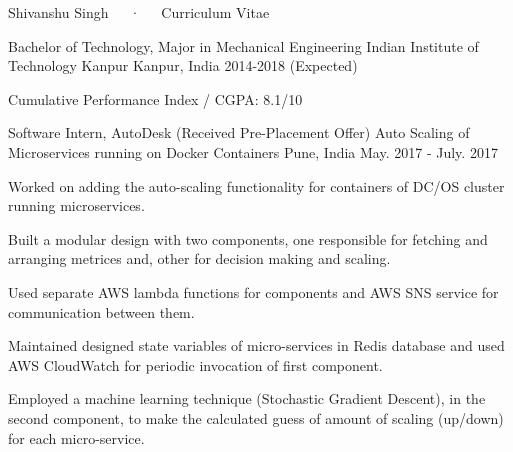 \documentclass[11pt, a4paper]{cv}
\begin{document}
\makecvheader

\makecvfooter
  {}
  {Shivanshu Singh~~~·~~~Curriculum Vitae}
  {\thepage}


\begin{cventries}

  \cventry
    {Bachelor of Technology, Major in Mechanical Engineering} %
    {Indian Institute of Technology Kanpur} %
    {Kanpur, India} %
        {2014-2018 (Expected)} %
    {
      \begin{cvitems} %
        \item {Cumulative Performance Index / CGPA: 8.1/10}
      \end{cvitems}
    }

\end{cventries}



\begin{cventries}

  \cventry
    {Software Intern, AutoDesk (Received Pre-Placement Offer)} %
    {Auto Scaling of Microservices running on Docker Containers} %
    {Pune, India} %
    {May. 2017 - July. 2017} %
    {
      \begin{cvitems} %
        \item {Worked on adding the auto-scaling functionality for containers of DC/OS cluster running microservices.}
        \item {Built a modular design with two components, one responsible for fetching and arranging metrices and, other for decision making and scaling.}
        \item {Used separate AWS lambda functions for components and AWS SNS service for communication between them.}
        \item {Maintained designed state variables of micro-services in Redis database and used AWS CloudWatch for periodic invocation of first component.}
        \item {Employed a machine learning technique (Stochastic Gradient Descent), in the second component, to make the calculated guess of amount of scaling (up/down) for each micro-service.}
      \end{cvitems}
    }

\end{cventries}
\end{document}
